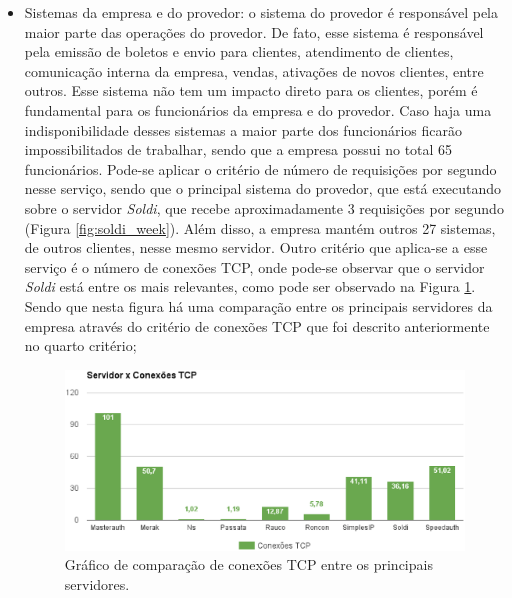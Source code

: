 \begin{itemize}
 \item Sistemas da empresa e do provedor: o sistema do provedor é responsável pela maior parte das operações do provedor. De fato, esse sistema é
 responsável pela emissão de boletos e envio para clientes, atendimento de clientes, comunicação interna da empresa, vendas, ativações de novos 
 clientes, entre outros. Esse sistema não tem um impacto direto para os clientes, porém é fundamental para os funcionários da empresa e do provedor. 
 Caso haja uma indisponibilidade desses sistemas a maior parte dos funcionários ficarão impossibilitados de trabalhar, sendo que a empresa possui 
 no total 65 funcionários.
 Pode-se aplicar o critério de número de requisições por segundo nesse serviço, sendo que o principal sistema do provedor, que está 
 executando sobre o servidor \textit{Soldi}, que recebe aproximadamente 3 requisições por segundo (Figura \ref{fig:soldi_week}). Além disso, a 
 empresa mantém outros 27 sistemas, de outros clientes, nesse mesmo servidor. Outro critério que aplica-se a esse serviço é o número de conexões 
 \ac{TCP}, onde pode-se observar que o servidor \textit{Soldi} está entre os mais relevantes, como pode ser observado na Figura 
 \ref{fig:servico_tcp}. Sendo que nesta figura há uma comparação entre os principais servidores da empresa através do critério de conexões 
 \ac{TCP} que foi descrito anteriormente no quarto critério;
 
\begin{figure}[h!]
 \centering
 \includegraphics[width=430px]{img/servico_tcp.eps}
 \caption{Gráfico de comparação de conexões TCP entre os principais servidores.}
 \label{fig:servico_tcp}
\end{figure}



\end{itemize}
